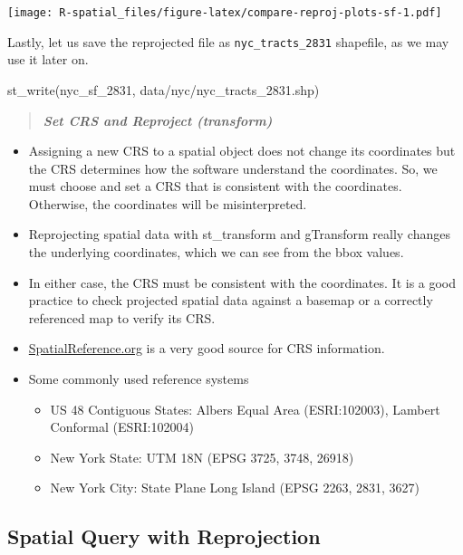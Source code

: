 \documentclass[
  11pt,
]{book}
\newenvironment{Shaded}{\begin{snugshade}}{\end{snugshade}}
\newcommand{\FunctionTok}[1]{\textcolor[rgb]{0.00,0.00,0.00}{#1}}
\newcommand{\NormalTok}[1]{#1}
\newcommand{\StringTok}[1]{\textcolor[rgb]{0.31,0.60,0.02}{#1}}
\providecommand{\tightlist}{%
  \setlength{\itemsep}{0pt}\setlength{\parskip}{0pt}}
\begin{document}
\texttt{[image: R-spatial\_files/figure-latex/compare-reproj-plots-sf-1.pdf]}

Lastly, let us save the reprojected file as \texttt{nyc\_tracts\_2831} shapefile, as we may use it later on.

\begin{Shaded}
\begin{Highlighting}[]
\FunctionTok{st\_write}\NormalTok{(nyc\_sf\_2831, }\StringTok{\textquotesingle{}data/nyc/nyc\_tracts\_2831.shp\textquotesingle{}}\NormalTok{)}
\end{Highlighting}
\end{Shaded}

\begin{quote}
\textbf{\emph{Set CRS and Reproject (transform)}}
\end{quote}

\begin{itemize}
\tightlist
\item
  Assigning a new CRS to a spatial object does not change its coordinates but the CRS determines how the software understand the coordinates. So, we must choose and set a CRS that is consistent with the coordinates. Otherwise, the coordinates will be misinterpreted.
\item
  Reprojecting spatial data with st\_transform and gTransform really changes the underlying coordinates, which we can see from the bbox values.\\
\item
  In either case, the CRS must be consistent with the coordinates. It is a good practice to check projected spatial data against a basemap or a correctly referenced map to verify its CRS.
\item
  \href{https://spatialreference.org/}{SpatialReference.org} is a very good source for CRS information.
\item
  Some commonly used reference systems

  \begin{itemize}
  \tightlist
  \item
    US 48 Contiguous States: Albers Equal Area (ESRI:102003), Lambert Conformal (ESRI:102004)
  \item
    New York State: UTM 18N (EPSG 3725, 3748, 26918)
  \item
    New York City: State Plane Long Island (EPSG 2263, 2831, 3627)
  \end{itemize}
\end{itemize}

\hypertarget{spatial-query-with-reprojection}{%
\subsection{Spatial Query with Reprojection}\label{spatial-query-with-reprojection}}
\end{document}
